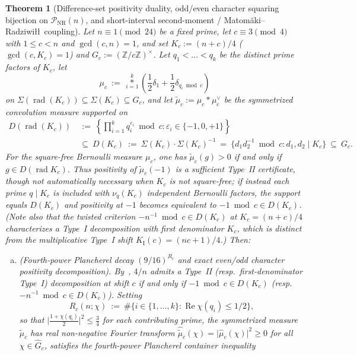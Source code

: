 \documentclass[11pt, a4paper]{article}
\theoremstyle{plain}
\newtheorem{theorem}{Theorem}[section]
\theoremstyle{definition}
\newcommand{\Z}{\mathbb{Z}}
\newcommand{\I}{\mathrm{I}}
\begin{document}
\begin{theorem}[Difference-set positivity duality, odd/even character squaring bijection on $\mathcal{P}_{\mathrm{NR}}(n)$, and short-interval second-moment / Matom\"{a}ki--Radziwi\l\l\ coupling]\label{thm:difference_set_positivity_MR}
Let $n\equiv1\pmod{24}$ be a fixed prime, let $c\equiv3\pmod 4$ with $1\le c<n$ and $\gcd(c,n)=1$, and set $K_c:=(n+c)/4$ ($\gcd(c,K_c)=1$) and $G_c:=(\Z/c\Z)^{\times}$. Let $q_1<\dots<q_k$ be the distinct prime factors of $K_c$, let
\[
\mu_c\ :=\ \operatorname*{\ast}_{i=1}^{k}\left(\frac12\delta_1+\frac12\delta_{q_i\bmod c}\right)
\]
on $\Sigma(\operatorname{rad}(K_c))\subseteq\Sigma(K_c)\subseteq G_c$, and let $\widetilde{\mu}_c:=\mu_c\ast\mu_c^{\vee}$ be the symmetrized convolution measure supported on
\[
\begin{aligned}
D(\operatorname{rad}(K_c))\ &:=\ \left\{\prod_{i=1}^{k}q_i^{\varepsilon_i}\bmod c:\varepsilon_i\in\{-1,0,+1\}\right\}\\
&\subseteq\ D(K_c)\ :=\ \Sigma(K_c)\cdot\Sigma(K_c)^{-1}\ =\ \big\{d_1d_2^{-1}\bmod c:d_1,d_2\mid K_c\big\}\ \subseteq\ G_c.
\end{aligned}
\]
For the square-free Bernoulli measure $\mu_c$, one has $\widetilde{\mu}_c(g)>0$ if and only if $g\in D(\operatorname{rad}K_c)$. Thus positivity of $\widetilde{\mu}_c(-1)$ is a sufficient Type~II certificate, though not automatically necessary when $K_c$ is not square-free; if instead each prime $q\mid K_c$ is included with $\nu_q(K_c)$ independent Bernoulli factors, the support equals $D(K_c)$ and positivity at $-1$ becomes equivalent to $-1\bmod c\in D(K_c)$. (Note also that the twisted criterion $-n^{-1}\bmod c\in D(K_c)$ at $K_c=(n+c)/4$ characterizes a Type~I decomposition with first denominator $K_c$, which is distinct from the multiplicative Type~I shift $K_{\I}(c)=(nc+1)/4$.) Then:
\begin{enumerate}[(a)]
    \item \emph{(Fourth-power Plancherel decay $(9/16)^{R_c}$ and exact even/odd character positivity decomposition).} By~\cite[Prop.~2.4]{dahan2026a}, $4/n$ admits a Type~II (resp.\ first-denominator Type~I) decomposition at shift $c$ if and only if $-1\bmod c\in D(K_c)$ (resp.\ $-n^{-1}\bmod c\in D(K_c)$). Setting
    \[
    R_c(n;\chi)\ :=\ \#\big\{i\in\{1,\dots,k\}:\operatorname{Re}\chi(q_i)\le 1/2\big\},
    \]
    so that $\big|\frac{1+\chi(q_i)}{2}\big|^{2}\le\frac34$ for each contributing prime, the symmetrized measure $\widetilde{\mu}_c$ has real non-negative Fourier transform $\widehat{\widetilde{\mu}}_c(\chi)=\big|\widehat{\mu}_c(\chi)\big|^{2}\ge0$ for all $\chi\in\widehat{G}_c$, satisfies the fourth-power Plancherel container inequality

\end{enumerate}
\end{theorem}
\end{document}
